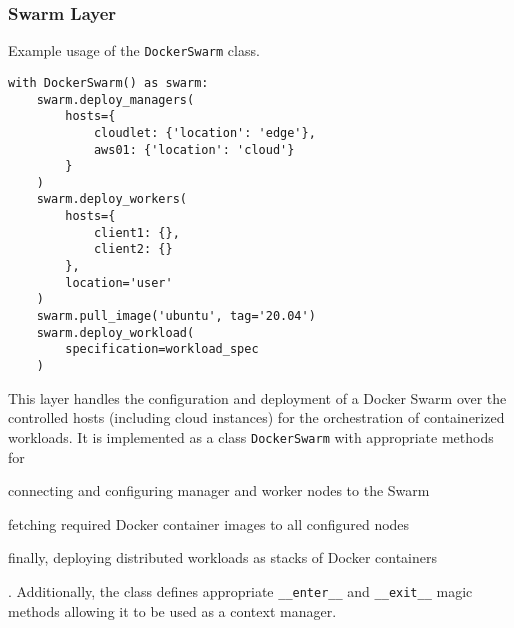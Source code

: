 \subsubsection{Swarm Layer}\label{sec:swarm}

\begin{listing}[tb]
\caption{Example usage of the \texttt{DockerSwarm} class.}\label{lst:swarm:example}
\begin{verbatim}
with DockerSwarm() as swarm:
    swarm.deploy_managers(
        hosts={
            cloudlet: {'location': 'edge'},
            aws01: {'location': 'cloud'}
        }
    )
    swarm.deploy_workers(
        hosts={
            client1: {},
            client2: {}
        },
        location='user'
    )
    swarm.pull_image('ubuntu', tag='20.04')
    swarm.deploy_workload(
        specification=workload_spec
    )
\end{verbatim}
\end{listing}
    

This layer handles the configuration and deployment of a Docker Swarm over the controlled hosts (including cloud instances) for the orchestration of containerized workloads.
It is implemented as a class \texttt{DockerSwarm} with appropriate methods for
\begin{inlineenum}
    \item connecting and configuring manager and worker nodes to the Swarm
    \item fetching required Docker container images to all configured nodes
    \item finally, deploying distributed workloads as stacks of Docker containers
\end{inlineenum}.
Additionally, the class defines appropriate \texttt{__enter__} and \texttt{__exit__} magic methods allowing it to be used as a context manager.


